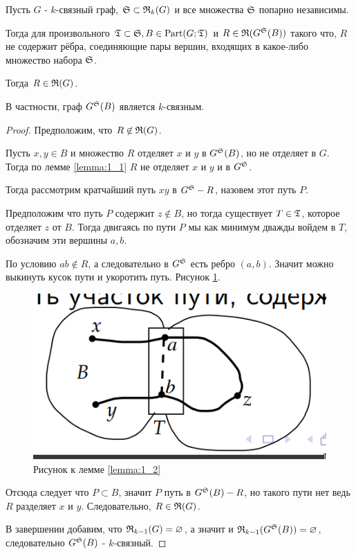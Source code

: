 \documentclass[../main.tex]{subfiles}
\begin{document}
\begin{lm}[Лемма 1.2] \label{lemma:1_2}
	Пусть $G$ - $k$-связный граф, $\S \subset \R_k(G)$ и все множества $\S$ попарно независимы.

	Тогда для произвольного $\T \subset \S, B \in \Part(G; \T)$ и $R \in \R(G^\S(B))$ такого что, $R$ не содержит рёбра, соединяющие пары вершин, входящих в какое-либо множество набора $\S$.
	
	Тогда $R \in \R(G)$.

	В частности, граф  $G^\S(B)$ является $k$-связным.
\end{lm}

\begin{proof}

	Предположим, что $R \not \in \R(G)$.

	Пусть $x, y \in B$ и множество  $R$ отделяет $x$ и $y$ в $G^\S(B)$, но не отделяет в $G$.
	Тогда по лемме \ref{lemma:1_1} $R$ не отделяет $x$ и $y$ и в $G^\S$.

	Тогда рассмотрим кратчайший путь  $xy$ в $G^\S - R$, назовем этот путь $P$.

	Предположим что путь $P$ содержит $z \not \in B$, но тогда существует $T \in \T$, которое отделяет $z$ от $B$.
	Тогда двигаясь по пути $P$ мы как минимум дважды войдем в $T$, обозначим эти вершины $a, b$.

	По условию $ab \not \in R$, а следовательно в $G^\S$ есть ребро $(a,b)$.
	Значит можно выкинуть кусок пути и укоротить путь.
	Рисунок \ref{fig:lemma_1_2}.

\begin{figure}[ht]
    \centering
	\includegraphics[width=0.3\columnwidth]{figures/lemma_1_2.png}
    \caption{Рисунок к лемме \ref{lemma:1_2}}
    \label{fig:lemma_1_2}
\end{figure}

	Отсюда следует что $P \subset B$, значит $P$ путь в  $G^\S(B) - R$, но такого пути нет ведь $R$ разделяет $x$ и $y$.
	Следовательно, $R \in \R(G)$.

	В завершении добавим, что $\R_{k-1}(G) = \varnothing$, а значит и  $\R_{k - 1}(G^\S(B)) = \varnothing$, следовательно $G^\S(B)$ - $k$-связный.
	
\end{proof}
\end{document}
